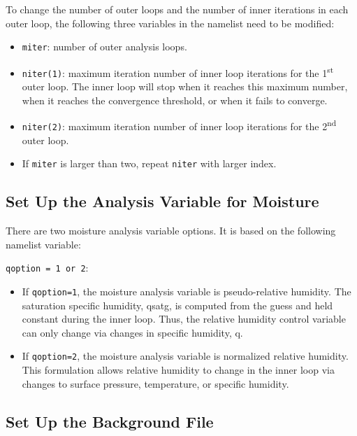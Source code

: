 To change the number of outer loops and the number of inner iterations in each outer loop, the following three variables in the namelist need to be modified: 

\begin{itemize}
\item \verb|miter|: number of outer analysis loops.
\item \verb|niter(1)|: maximum iteration number of inner loop iterations for the 1\textsuperscript{st} outer loop. The inner loop will stop when it reaches this maximum number, when it reaches the convergence threshold, or when it fails to converge.
\item \verb|niter(2)|: maximum iteration number of inner loop iterations for the 2\textsuperscript{nd} outer loop.
\item If \verb|miter| is larger than two, repeat \verb|niter| with larger index.
\end{itemize}

\subsection{Set Up the Analysis Variable for Moisture}

There are two moisture analysis variable options. It is based on the following namelist variable:

\verb|qoption = 1 or 2|: 
\begin{itemize}
\item If \verb|qoption=1|, the moisture analysis variable is pseudo-relative humidity.  The saturation specific humidity, qsatg, is computed from the guess and held constant during the inner loop.  Thus, the relative humidity control variable can only change via changes in specific humidity, q.
\item If \verb|qoption=2|, the moisture analysis variable is normalized relative humidity. This formulation allows relative humidity to change in the inner loop via changes to surface pressure, temperature, or specific humidity.
\end{itemize}

\subsection{Set Up the Background File}

